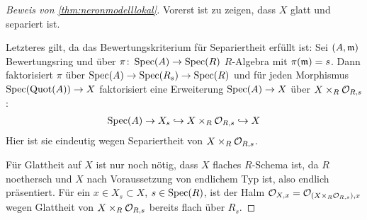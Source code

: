 
\begin{proof}[Beweis von \ref{thm:neronmodelllokal}]
  Vorerst ist zu zeigen, dass $X$ glatt und separiert ist.

  Letzteres gilt, da das Bewertungskriterium für Separiertheit
  erfüllt ist: Sei $(A,\mathfrak{m})$ Bewertungsring und über
  $\pi\colon\operatorname{Spec}(A)\to\operatorname{Spec}(R)$ $R$-Algebra mit $\pi(\mathfrak{m})=s$.
  Dann faktorisiert $\pi$ über
  $\operatorname{Spec}(A)\to\operatorname{Spec}(R_s)\to\operatorname{Spec}(R)$ und für jeden Morphismus
  $\operatorname{Spec}(\operatorname{Quot}(A))\to X$ faktorisiert eine Erweiterung
  $\operatorname{Spec}(A)\to X$ über $X\times_R\mathcal{O}_{R,s}$:
  \begin{gather*}
    \operatorname{Spec}(A)\to X_s\hookrightarrow X\times_R\mathcal{O}_{R,s}\hookrightarrow X
  \end{gather*}
  Hier ist sie eindeutig wegen
  Separiertheit von $X\times_R\mathcal{O}_{R,s}$.

  Für Glattheit auf $X$ ist nur noch nötig, dass $X$ flaches
  $R$-Schema ist, da $R$ noethersch und $X$ nach Voraussetzung von
  endlichem Typ ist, also endlich präsentiert.
  Für ein $x\in X_s\subset X$, $s\in\operatorname{Spec}(R)$, ist der Halm
  $\mathcal{O}_{X,x}=\mathcal{O}_{(X\times_R\mathcal{O}_{R,s}),x}$ wegen Glattheit von
  $X\times_R\mathcal{O}_{R,s}$ bereits flach über $R_s$.


\end{proof}
